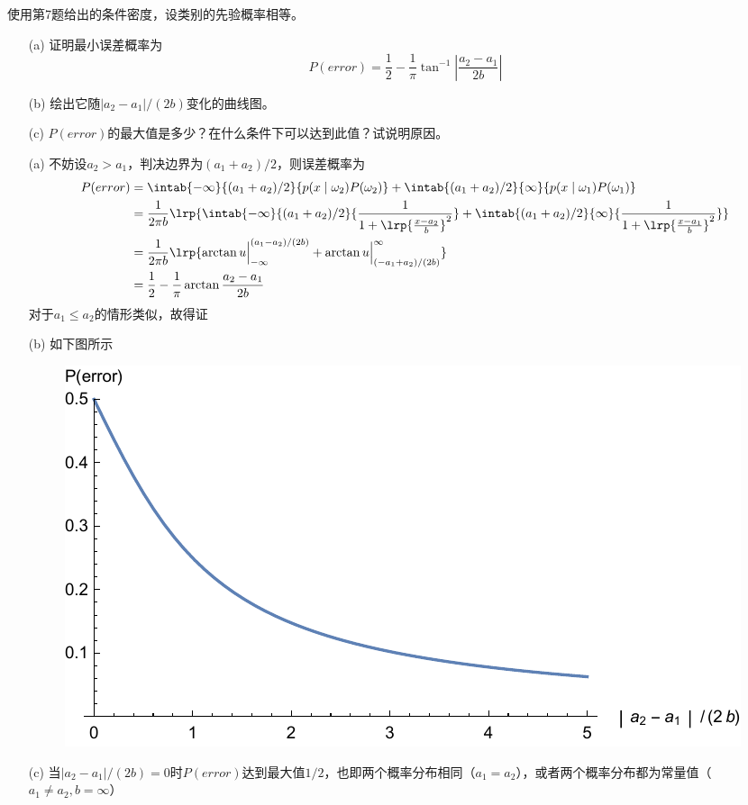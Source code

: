 \documentclass[reportComp]{thesis}
\begin{document}
\begin{question}[\textsection 2 Q9]
使用第7题给出的条件密度，设类别的先验概率相等。
\begin{itemize}
	\item [(a)] 证明最小误差概率为
	\[P(error)=\frac{1}{2}-\frac{1}{\pi}\tan^{-1}\left|\frac{a_2-a_1}{2b}\right|\]
	\item [(b)] 绘出它随$|a_2-a_1|/(2b)$变化的曲线图。
	\item [(c)] $P(error)$的最大值是多少？在什么条件下可以达到此值？试说明原因。
\end{itemize}
\end{question}
\begin{answer}
\begin{itemize}
	\item [(a)] 不妨设$a_2>a_1$，判决边界为$(a_1+a_2)/2$，则误差概率为
	\[\begin{aligned}
	P(error)&=\intab{-\infty}{(a_1+a_2)/2}{p(x\mid \omega_2)P(\omega_2)}+\intab{(a_1+a_2)/2}{\infty}{p(x\mid \omega_1)P(\omega_1)}\\
	&=\frac{1}{2\pi b}\lrp{\intab{-\infty}{(a_1+a_2)/2}{\frac{1}{1+\lrp{\frac{x-a_2}{b}}^2}}+\intab{(a_1+a_2)/2}{\infty}{\frac{1}{1+\lrp{\frac{x-a_1}{b}}^2}}}\\
	&=\frac{1}{2\pi b}\lrp{\arctan u\Big|_{-\infty}^{(a_1-a_2)/(2b)}+\arctan u\Big|_{(-a_1+a_2)/(2b)}^{\infty}}\\
	&=\frac{1}{2}-\frac{1}{\pi}\arctan\frac{a_2-a_1}{2b}
	\end{aligned}\]
	对于$a_1\leq a_2$的情形类似，故得证

	\item [(b)] 如下图所示
	\begin{figure}[H]
	\centering
	\includegraphics[width=0.5\linewidth]{error.pdf}
	\end{figure}

	\item [(c)] 当$|a_2-a_1|/(2b)=0$时$P(error)$达到最大值$1/2$，也即两个概率分布相同（$a_1=a_2$），或者两个概率分布都为常量值（$a_1\ne a_2,b=\infty$）
\end{itemize}
\end{answer}
\end{document}
